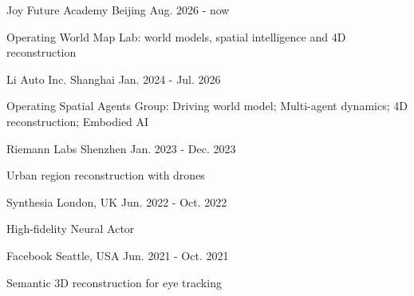 


\begin{cventries}

{Joy Future Academy} %
{Beijing} %
{Aug. 2026 - now} %
{ %
\begin{cvitems}
\item {Operating World Map Lab: world models, spatial intelligence and 4D reconstruction}
\end{cvitems}
}

{Li Auto Inc.} %
{Shanghai} %
{Jan. 2024 - Jul. 2026} %
{ %
\begin{cvitems}
\item {Operating Spatial Agents Group: Driving world model; Multi-agent dynamics; 4D reconstruction; Embodied AI}
\end{cvitems}
}

{Riemann Labs} %
{Shenzhen} %
{Jan. 2023 - Dec. 2023} %
{ %
\begin{cvitems}
\item {Urban region reconstruction with drones}
\end{cvitems}
}

{Synthesia} %
{London, UK} %
{Jun. 2022 - Oct. 2022} %
{ %
\begin{cvitems}
\item {High-fidelity Neural Actor}
\end{cvitems}
}

{Facebook} %
{Seattle, USA} %
{Jun. 2021 - Oct. 2021} %
{ %
\begin{cvitems}
\item {Semantic 3D reconstruction for eye tracking}
\end{cvitems}
}


\end{cventries}
